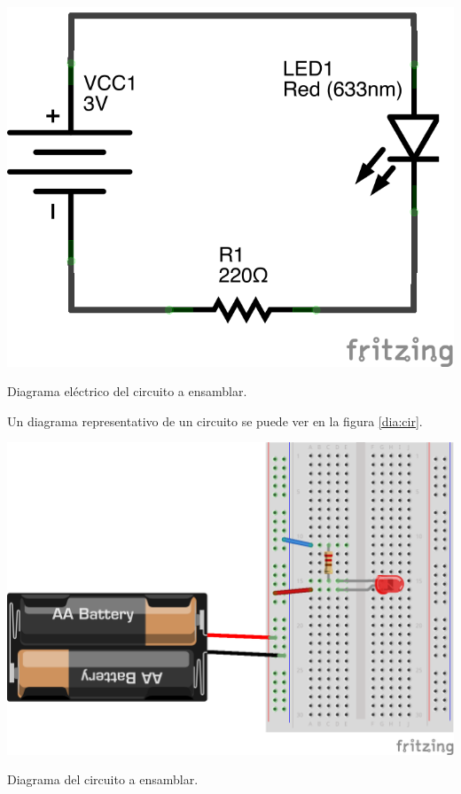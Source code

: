     \begin{marginfigure}%
    	\begin{center}
    		\includegraphics[width=\textwidth]{images/LED-bateria-diagrama.png}
    		\caption{Diagrama eléctrico del circuito a ensamblar.}
    		\label{dia:elecir}
    	\end{center}
    \end{marginfigure}

    Un diagrama representativo de un circuito se puede ver en la figura \ref{dia:cir}. \\

    \begin{marginfigure}%
    	\begin{center}
    		\includegraphics[width=\textwidth]{images/LED-bateria.png}
    		\caption{Diagrama del circuito a ensamblar.}
    		\label{dia:cir}
    	\end{center}
    \end{marginfigure}

